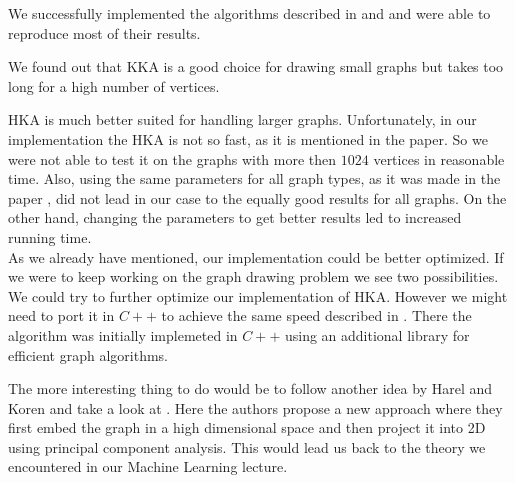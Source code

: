 \documentclass[12pt,a4paper]{article}
\begin{document}

We successfully implemented the algorithms described in \cite{TomihisaKamada1989} and \cite{DavidHarel2002} and were able to reproduce most of their results. 

We found out that KKA is a good choice for drawing small graphs but takes too long for a high number of vertices.

HKA is much better suited for handling larger graphs. Unfortunately, in our implementation the HKA is not so fast, as it is mentioned in the paper. So we were not able to test it on the graphs with more then $1024$ vertices in reasonable time. Also, using the same parameters for all graph types, as it was made in the paper \cite{DavidHarel2002}, did not lead in our case to the equally good results for all graphs. On the other hand, changing the parameters to get better results led to increased running time. \\
As we already have mentioned, our implementation could be better optimized. If we were to keep working on the graph drawing problem we see two possibilities. We could try to further optimize our implementation of HKA. However we might need to port it in $C++$ to achieve the same speed described in \cite{DavidHarel2002}. There the algorithm was initially implemeted in $C++$ using an additional library for efficient graph algorithms.

The more interesting thing to do would be to follow another idea by Harel and Koren and take a look at \cite{Harel2004}. Here the authors propose a new approach where they first embed the graph in a high dimensional space and then project it into 2D using principal component analysis. This would lead us back to the theory we encountered in our Machine Learning lecture.
\end{document}

